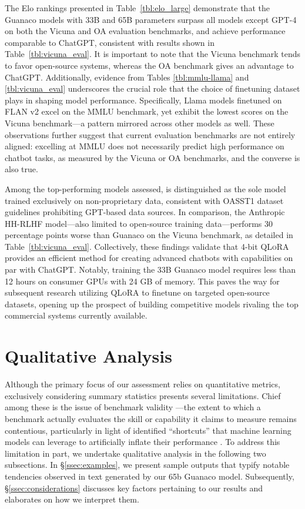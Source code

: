 The Elo rankings presented in Table~\ref{tbl:elo_large} demonstrate that the {Guanaco} models with 33B and 65B parameters surpass all models except GPT-4 on both the Vicuna and OA evaluation benchmarks, and achieve performance comparable to ChatGPT, consistent with results shown in Table~\ref{tbl:vicuna_eval}. It is important to note that the Vicuna benchmark tends to favor open-source systems, whereas the OA benchmark gives an advantage to ChatGPT. Additionally, evidence from Tables \ref{tbl:mmlu-llama} and \ref{tbl:vicuna_eval} underscores the crucial role that the choice of finetuning dataset plays in shaping model performance. Specifically, Llama models finetuned on FLAN v2 excel on the MMLU benchmark, yet exhibit the lowest scores on the Vicuna benchmark—a pattern mirrored across other models as well. These observations further suggest that current evaluation benchmarks are not entirely aligned: excelling at MMLU does not necessarily predict high performance on chatbot tasks, as measured by the Vicuna or OA benchmarks, and the converse is also true.

Among the top-performing models assessed, is distinguished as the sole model trained exclusively on non-proprietary data, consistent with OASST1 dataset guidelines prohibiting GPT-based data sources. In comparison, the Anthropic HH-RLHF model—also limited to open-source training data—performs 30 percentage points worse than {Guanaco} on the Vicuna benchmark, as detailed in Table~\ref{tbl:vicuna_eval}. Collectively, these findings validate that 4-bit \textsc{QLoRA} provides an efficient method for creating advanced chatbots with capabilities on par with ChatGPT. Notably, training the 33B {Guanaco} model requires less than 12 hours on consumer GPUs with 24 GB of memory. This paves the way for subsequent research utilizing \textsc{QLoRA} to finetune on targeted open-source datasets, opening up the prospect of building competitive models rivaling the top commercial systems currently available.

\section{Qualitative Analysis}

Although the primary focus of our assessment relies on quantitative metrics, exclusively considering summary statistics presents several limitations. Chief among these is the issue of benchmark validity \citep{liao2021we}—the extent to which a benchmark actually evaluates the skill or capability it claims to measure remains contentious, particularly in light of identified ``shortcuts'' that machine learning models can leverage to artificially inflate their performance \citep{gururangan2018annotation, poliak2018hypothesis}. To address this limitation in part, we undertake qualitative analysis in the following two subsections. In \S\ref{ssec:examples}, we present sample outputs that typify notable tendencies observed in text generated by our 65b {Guanaco} model. Subsequently, \S\ref{ssec:considerations} discusses key factors pertaining to our results and elaborates on how we interpret them.

